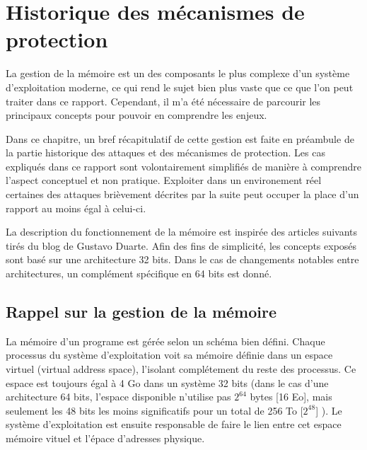 \chapter{Historique des mécanismes de protection}
\label{chap:historique}

La gestion de la mémoire est un des composants le plus complexe d'un système d'exploitation moderne, ce qui rend le sujet bien plus vaste que ce que l'on peut traiter dans ce rapport. Cependant, il m'a été nécessaire de parcourir les principaux concepts pour pouvoir en comprendre les enjeux.

Dans ce chapitre, un bref récapitulatif de cette gestion est faite en préambule de la partie historique des attaques et des mécanismes de protection. Les cas expliqués dans ce rapport sont volontairement simplifiés de manière à comprendre l'aspect conceptuel et non pratique. Exploiter dans un environement réel certaines des attaques brièvement décrites par la suite peut occuper la place d'un rapport au moins égal à celui-ci.

La description du fonctionnement de la mémoire est inspirée des articles suivants \cite{AnatomyOfAProgramInMemory} \cite{HowTheKernelManagesYourMemory} \cite{JourneyToTheStackPartI} tirés du blog de Gustavo Duarte. Afin des fins de simplicité, les concepts exposés sont basé sur une architecture 32 bits. Dans le cas de changements notables entre architectures, un complément spécifique en 64 bits est donné.

\minitoc

\newpage

\section{Rappel sur la gestion de la mémoire}

La mémoire d'un programe est gérée selon un schéma bien défini. Chaque processus du système d'exploitation voit sa mémoire définie dans un espace virtuel (virtual address space), l'isolant complétement du reste des processus. Ce espace est toujours égal à 4 Go dans un système 32 bits (dans le cas d'une architecture 64 bits, l'espace disponible n'utilise pas $2^{64}$ bytes [16 Eo], mais seulement les 48 bits les moins significatifs pour un total de 256 To [$2^{48}$] \cite{64bitComputing} \cite{VirtualAddressSpaceDetails}). Le système d'exploitation est ensuite responsable de faire le lien entre cet espace mémoire vituel et l'épace d'adresses physique.

